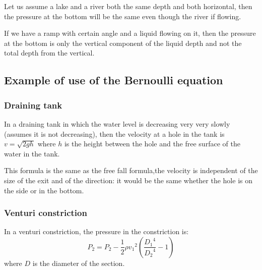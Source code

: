 \documentclass[10pt, twocolumn]{article}
\begin{document}
\begin{example}
  Let us assume a lake and a river both the same depth and both horizontal, then the pressure at the bottom will be the same even though the river if flowing.
\end{example}
\begin{example}
  If we have a ramp with certain angle and a liquid flowing on it, then the pressure at the bottom is only the vertical component of the liquid depth and not the total depth from the vertical.
\end{example}


\subsection{Example of use of the Bernoulli equation}
\subsubsection{Draining tank}
In a draining tank in which the water level is decreasing very very slowly (assumes it is not decreasing), then the velocity at a hole in the tank is \(v = \sqrt{2gh}\) where \(h\) is the height between the hole and the free surface of the water in the tank.

\begin{remark}
  This formula is the same as the free fall formula,the velocity is independent of the size of the exit and of the direction: it would be the same whether the hole is on the side or in the bottom.
\end{remark}


\subsubsection{Venturi constriction}
In a venturi constriction, the pressure in the constriction is:
\[
  P_2 = P_2 - \frac{1}{2} \rho {v_1}^2 \left( \frac{{D_1}^4}{{D_2}^4} - 1 \right)
\]
where \(D\) is the diameter of the section.
\end{document}
